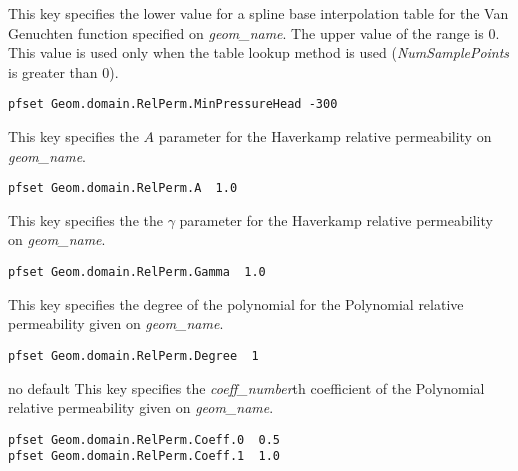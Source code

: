  {This key specifies the lower value for a spline base interpolation
 table for the Van Genuchten function specified on {\em geom\_name}.
  The upper value of the range is 0.  This value is used only when the
 table lookup method is used ({\em NumSamplePoints} is greater than 0).
  }
\begin{display}\begin{verbatim}
pfset Geom.domain.RelPerm.MinPressureHead -300
\end{verbatim}\end{display}

{This key specifies the $A$ parameter for the Haverkamp relative permeability
on {\em geom\_name}.
}
\begin{display}\begin{verbatim}
pfset Geom.domain.RelPerm.A  1.0
\end{verbatim}\end{display}

{This key specifies the the $\gamma$ parameter for the Haverkamp relative
permeability on {\em geom\_name}.
}
\begin{display}\begin{verbatim}
pfset Geom.domain.RelPerm.Gamma  1.0
\end{verbatim}\end{display}

{This key specifies the degree of the polynomial for the Polynomial relative
permeability given on {\em geom\_name}.
}
\begin{display}\begin{verbatim}
pfset Geom.domain.RelPerm.Degree  1
\end{verbatim}\end{display}

{no default}
{This key specifies the {\em coeff\_number}th coefficient of the Polynomial
relative permeability given on {\em geom\_name}.
}
\begin{display}\begin{verbatim}
pfset Geom.domain.RelPerm.Coeff.0  0.5
pfset Geom.domain.RelPerm.Coeff.1  1.0
\end{verbatim}\end{display}

